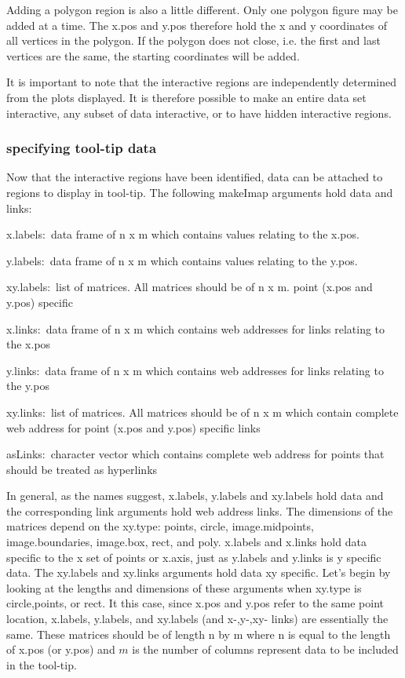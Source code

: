 \documentclass[]{article}
\begin{document}
\indent Adding a polygon region is also a little different. Only one polygon figure may be added at a time. The x.pos and y.pos therefore hold the x and y coordinates of all vertices in the polygon. If the polygon does not close, i.e. the first and last vertices are the same, the starting coordinates will be added. \newline

\indent It is important to note that the interactive regions are independently determined from the plots displayed. It is therefore possible to make an entire data set interactive, any subset of data interactive, or to have hidden interactive regions. 

\subsubsection{specifying tool-tip data}

\indent Now that the interactive regions have been identified, data can be attached to regions to display in tool-tip. The following makeImap arguments hold data and links:
\begin{description}
   \item{x.labels:~}{data frame of n x m which contains values relating to the x.pos.}
   \item{y.labels:~}{data frame of n x m which contains values relating to the y.pos.}
   \item{xy.labels:~}{list of matrices. All matrices should be of n x m. point (x.pos and y.pos) specific}
   \item{x.links:~}{data frame of n x m which contains web addresses for links relating to the x.pos}
   \item{y.links:~}{data frame of n x m which contains web addresses for links relating to the y.pos}
   \item{xy.links:~}{list of matrices. All matrices should be of n x m which contain complete web address for point (x.pos and y.pos) specific links}
   \item{asLinks:~}{character vector which contains complete web address for points that should be treated as hyperlinks}
\end{description}

\indent In general, as the names suggest, x.labels, y.labels and xy.labels hold data and the corresponding link arguments hold web address links. The dimensions of the matrices depend on the xy.type: points, circle, image.midpoints, image.boundaries, image.box, rect, and poly. x.labels and x.links hold data specific to the x set of points or x.axis, just as y.labels and y.links is y specific data. The xy.labels and xy.links arguments hold data xy specific. Let's begin by looking at the lengths and dimensions of these arguments when xy.type is circle,points, or rect. It this case, since x.pos and y.pos refer to the same point location, x.labels, y.labels, and xy.labels (and x-,y-,xy- links) are essentially the same. These matrices should be of length n by m where n is equal to the length of x.pos (or y.pos) and $m$ is the number of columns represent data to be included in the tool-tip.\newline
\end{document}

